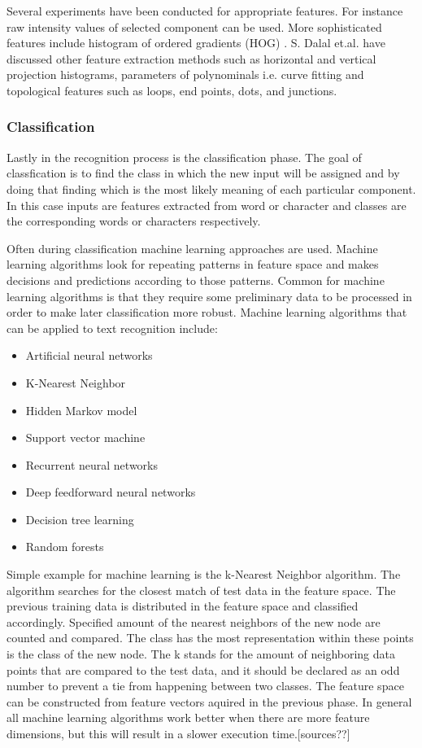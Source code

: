 \documentclass{article}
\begin{document}
        Several experiments have been conducted for appropriate features. For instance raw intensity values of selected component can be used. More sophisticated features include histogram of ordered gradients (HOG) \cite{Dalal2005}. S. Dalal et.al. have discussed other feature extraction methods such as horizontal and vertical projection histograms, parameters of polynominals i.e. curve fitting and topological features such as loops, end points, dots, and junctions. \cite{Dalal}
      \subsubsection{Classification}
      Lastly in the recognition process is the classification phase. The goal of classfication is to find the class in which the new input will be assigned and by doing that finding which is the most likely meaning of each particular component. In this case inputs are features extracted from word or character and classes are the corresponding words or characters respectively.

      Often during classification machine learning approaches are used. Machine learning algorithms look for repeating patterns in feature space and makes decisions and predictions according to those patterns. Common for machine learning algorithms is that they require some preliminary data to be processed in order to make later classification more robust. Machine learning algorithms that can be applied to text recognition include:
      \begin{itemize}
        \item Artificial neural networks
        \item K-Nearest Neighbor
        \item Hidden Markov model
        \item Support vector machine
        \item Recurrent neural networks
        \item Deep feedforward neural networks
        \item Decision tree learning
        \item Random forests
      \end{itemize}
        Simple example for machine learning is the k-Nearest Neighbor algorithm. The algorithm searches for the closest match of test data in the feature space. The previous training data is distributed in the feature space and classified accordingly. Specified amount of the nearest neighbors of the new node are counted and compared. The class has the most representation within these points is the class of the new node. The k stands for the amount of neighboring data points that are compared to the test data, and it should be declared as an odd number to prevent a tie from happening between two classes. The feature space can be constructed from feature vectors aquired in the previous phase. In general all machine learning algorithms work better when there are more feature dimensions, but this will result in a slower execution time.[sources??]
\end{document}
